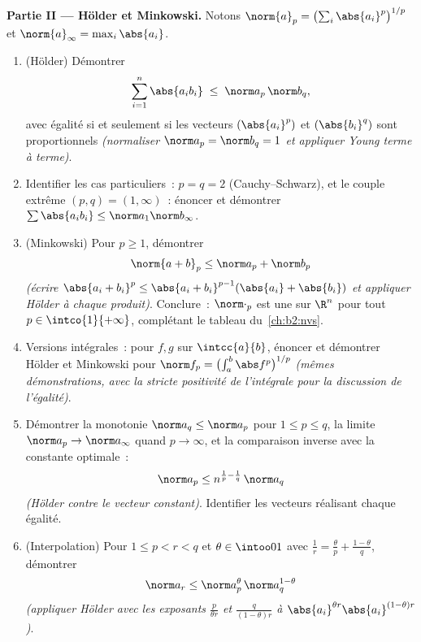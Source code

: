 \begin{problem}
\medskip
\noindent\textbf{Partie II --- Hölder et Minkowski.} Notons
$\norm{a}_p = \bigl(\sum_i \abs{a_i}^p\bigr)^{1/p}$ et
$\norm{a}_\infty = \max_i\abs{a_i}$.
\begin{enumerate}[resume]
  \item (Hölder) Démontrer
        \[
        \sum_{i=1}^{n}\abs{a_ib_i} \;\leq\;
        \norm a_p\,\norm b_q ,
        \]
        avec égalité si et seulement si les vecteurs $(\abs{a_i}^p)$
        et $(\abs{b_i}^q)$ sont proportionnels \emph{(normaliser
        $\norm a_p = \norm b_q = 1$ et appliquer Young terme à
        terme)}.
  \item Identifier les cas particuliers~: $p = q = 2$
        (Cauchy--Schwarz), et le couple extrême $(p, q) = (1,
        \infty)$~: énoncer et démontrer $\sum\abs{a_ib_i} \leq
        \norm a_1\norm b_\infty$.
  \item (Minkowski) Pour $p \geq 1$, démontrer
        \[
        \norm{a + b}_p \leq \norm a_p + \norm b_p
        \]
        \emph{(écrire $\abs{a_i + b_i}^p \leq \abs{a_i +
        b_i}^{p-1}(\abs{a_i} + \abs{b_i})$ et appliquer Hölder
        à chaque produit)}. Conclure~: $\norm\cdot_p$ est une 
        sur $\R^n$ pour tout $p \in \intco{1}{+\infty}$,
        complétant le tableau du~\cref{ch:b2:nvs}.
  \item Versions intégrales~: pour $f, g$  sur
        $\intcc{a}{b}$, énoncer et démontrer Hölder et Minkowski
        pour $\norm f_p = \bigl(\int_a^b\abs
        f^p\bigr)^{1/p}$ \emph{(mêmes démonstrations, avec la stricte
        positivité de l'intégrale pour la discussion de l'égalité)}.
  \item Démontrer la monotonie $\norm a_q \leq \norm a_p$ pour $1
        \leq p \leq q$, la limite $\norm a_p \to
        \norm a_\infty$ quand $p \to \infty$, et la comparaison
        inverse avec la constante optimale~:
        \[
        \norm a_p \leq n^{\frac1p - \frac1q}\,\norm a_q
        \]
        \emph{(Hölder contre le vecteur constant)}. Identifier
        les vecteurs réalisant chaque égalité.
  \item (Interpolation) Pour $1 \leq p < r < q$ et $\theta \in
        \intoo01$ avec $\frac1r = \frac\theta p +
        \frac{1-\theta}q$, démontrer
        \[
        \norm a_r \leq \norm a_p^{\theta}\,
        \norm a_q^{1-\theta}
        \]
        \emph{(appliquer Hölder avec les exposants $\frac{p}{\theta
        r}$ et $\frac{q}{(1-\theta)r}$ à $\abs{a_i}^{\theta
        r}\abs{a_i}^{(1-\theta)r}$)}.
\end{enumerate}


\end{problem}
